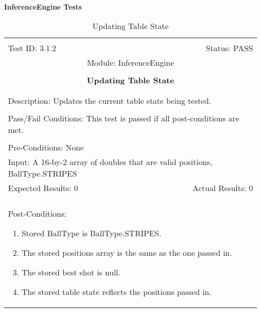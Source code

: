\documentclass[titlepage]{article}
\begin{document}
\large{\textbf{InferenceEngine Tests}}
\begin{center}
\begin{table}[h!]
\begin{tabular}{|l r|}\hline&\\[-2mm]
	Test ID: 3.1.2	&Status: PASS\\[-3mm]
	\multicolumn{2}{|c|}{Module: InferenceEngine}\\&\\
	\multicolumn{2}{|c|}{\textbf{\large{Updating Table State}}}\\&\\\hline&\\[-3mm]
	\multicolumn{2}{|p{\textwidth}|}{Description: Updates the current table state being tested.}\\[1mm]\hline&\\[-3mm]
	\multicolumn{2}{|p{\textwidth}|}{Pass/Fail Conditions: This test is passed if all post-conditions are met.}\\[1mm]\hline&\\[-3mm]
	\multicolumn{2}{|p{\textwidth}|}{Pre-Conditions: None}\\[4mm]
	\multicolumn{2}{|p{\textwidth}|}{Input: A 16-by-2 array of doubles that are valid positions, BallType.STRIPES}\\[2mm]\hline
	\multicolumn{1}{|p{0.49\textwidth}}{Expected Results: 0}	&\multicolumn{1}{|p{0.45\textwidth}|}{Actual Results: 0}\\\hline&\\[-3mm]
	\multicolumn{2}{|p{\textwidth}|}{Post-Conditions: \begin{enumerate}\item Stored BallType is BallType.STRIPES. \item The stored positions array is the same as the one passed in. \item The stored best shot is null. \item The stored table state reflects the positions passed in.\end{enumerate}}\\\hline
\end{tabular}
\caption{Updating Table State}
\end{table}
\end{center}
\end{document}
